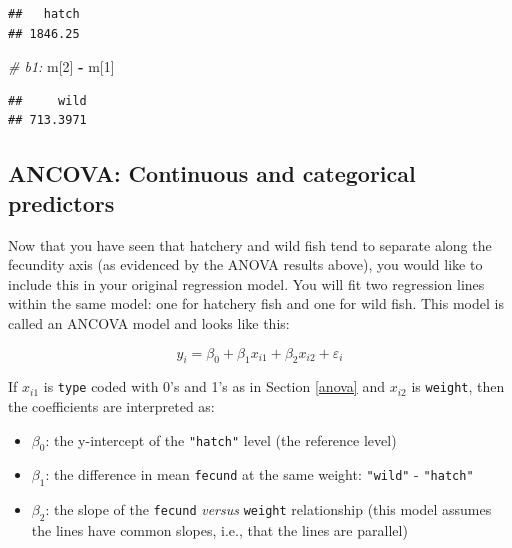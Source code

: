 \documentclass[]{book}
\newenvironment{Shaded}{\begin{snugshade}}{\end{snugshade}}
\newcommand{\CommentTok}[1]{\textcolor[rgb]{0.56,0.35,0.01}{\textit{#1}}}
\newcommand{\DataTypeTok}[1]{\textcolor[rgb]{0.13,0.29,0.53}{#1}}
\newcommand{\DecValTok}[1]{\textcolor[rgb]{0.00,0.00,0.81}{#1}}
\newcommand{\KeywordTok}[1]{\textcolor[rgb]{0.13,0.29,0.53}{\textbf{#1}}}
\newcommand{\NormalTok}[1]{#1}
\newcommand{\OperatorTok}[1]{\textcolor[rgb]{0.81,0.36,0.00}{\textbf{#1}}}
\newcommand{\StringTok}[1]{\textcolor[rgb]{0.31,0.60,0.02}{#1}}
\providecommand{\tightlist}{%
  \setlength{\itemsep}{0pt}\setlength{\parskip}{0pt}}
\begin{document}
\begin{Shaded}
\end{Shaded}

\begin{verbatim}
##   hatch 
## 1846.25
\end{verbatim}

\begin{Shaded}
\begin{Highlighting}[]
\CommentTok{# b1:}
\NormalTok{m[}\DecValTok{2}\NormalTok{] }\OperatorTok{-}\StringTok{ }\NormalTok{m[}\DecValTok{1}\NormalTok{]}
\end{Highlighting}
\end{Shaded}

\begin{verbatim}
##     wild 
## 713.3971
\end{verbatim}

\hypertarget{ancova-continuous-and-categorical-predictors}{%
\subsection{ANCOVA: Continuous and categorical predictors}\label{ancova-continuous-and-categorical-predictors}}

Now that you have seen that hatchery and wild fish tend to separate along the fecundity axis (as evidenced by the ANOVA results above), you would like to include this in your original regression model. You will fit two regression lines within the same model: one for hatchery fish and one for wild fish. This model is called an ANCOVA model and looks like this:

\begin{equation}
  y_i=\beta_0 + \beta_1 x_{i1} + \beta_2 x_{i2} + \varepsilon_i
\label{eq:ancova}
\end{equation}

If \(x_{i1}\) is \texttt{type} coded with 0's and 1's as in Section \ref{anova} and \(x_{i2}\) is \texttt{weight}, then the coefficients are interpreted as:

\begin{itemize}
\tightlist
\item
  \(\beta_0\): the y-intercept of the \texttt{"hatch"} level (the reference level)
\item
  \(\beta_1\): the difference in mean \texttt{fecund} at the same weight: \texttt{"wild"} - \texttt{"hatch"}
\item
  \(\beta_2\): the slope of the \texttt{fecund} \emph{versus} \texttt{weight} relationship (this model assumes the lines have common slopes, i.e., that the lines are parallel)
\end{itemize}
\end{document}

